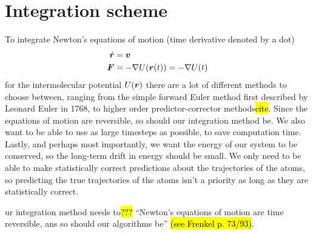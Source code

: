 \section{Integration scheme}





To integrate Newton's equations of motion (time derivative denoted by a dot)
\begin{align*}
    \dot {\boldsymbol{r}} &= \boldsymbol{v} \\
    \boldsymbol{F} &= -\nabla U(\boldsymbol{r}(t)) = -\nabla U(t)
\end{align*}
for the intermolecular potential $U(\boldsymbol{r})$ there are a lot of different methods to choose between, ranging from the simple forward Euler method first described by Leonard Euler in 1768, to higher order predictor-corrector methods\hl{cite}. Since the equations of motion are reversible, so should our integration method be. We also want to be able to use as large timesteps as possible, to save computation time. Lastly, and perhaps most importantly, we want the energy of our system to be conserved, so the long-term drift in energy should be small. We only need to be able to make statistically correct predictions about the trajectories of the atoms, so predicting the true trajectories of the atoms isn't a priority as long as they are statistically correct.

ur integration method needs to\hl{???} ``Newton's equations of motion are time reversible, ans so should our algorithms be'' \hl{(see Frenkel p. 73/93)}.

